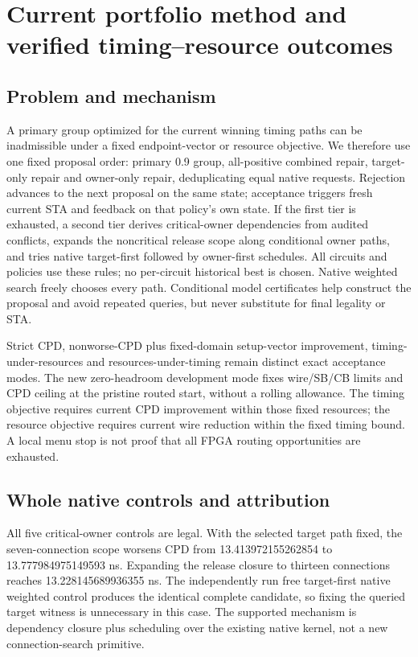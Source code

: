
\section{Current portfolio method and verified timing--resource outcomes}
\subsection{Problem and mechanism}
A primary group optimized for the current winning timing paths can be inadmissible under a fixed endpoint-vector or resource objective. We therefore use one fixed proposal order: primary 0.9 group, all-positive combined repair, target-only repair and owner-only repair, deduplicating equal native requests. Rejection advances to the next proposal on the same state; acceptance triggers fresh current STA and feedback on that policy's own state. If the first tier is exhausted, a second tier derives critical-owner dependencies from audited conflicts, expands the noncritical release scope along conditional owner paths, and tries native target-first followed by owner-first schedules. All circuits and policies use these rules; no per-circuit historical best is chosen. Native weighted search freely chooses every path. Conditional model certificates help construct the proposal and avoid repeated queries, but never substitute for final legality or STA.

Strict CPD, nonworse-CPD plus fixed-domain setup-vector improvement, timing-under-resources and resources-under-timing remain distinct exact acceptance modes. The new zero-headroom development mode fixes wire/SB/CB limits and CPD ceiling at the pristine routed start, without a rolling allowance. The timing objective requires current CPD improvement within those fixed resources; the resource objective requires current wire reduction within the fixed timing bound. A local menu stop is not proof that all FPGA routing opportunities are exhausted.

\subsection{Whole native controls and attribution}
All five critical-owner controls are legal. With the selected target path fixed, the seven-connection scope worsens CPD from 13.413972155262854 to 13.777984975149593 ns. Expanding the release closure to thirteen connections reaches 13.228145689936355 ns. The independently run free target-first native weighted control produces the identical complete candidate, so fixing the queried target witness is unnecessary in this case. The supported mechanism is dependency closure plus scheduling over the existing native kernel, not a new connection-search primitive.

